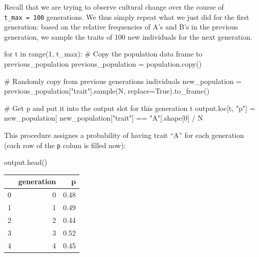\documentclass[
  a4paperpaper,
  ,captions=tableheading
]{scrbook}
\newenvironment{Shaded}{\begin{snugshade}}{\end{snugshade}}
\newcommand{\BuiltInTok}[1]{\textcolor[rgb]{0.00,0.23,0.31}{#1}}
\newcommand{\CommentTok}[1]{\textcolor[rgb]{0.37,0.37,0.37}{#1}}
\newcommand{\ControlFlowTok}[1]{\textcolor[rgb]{0.00,0.23,0.31}{#1}}
\newcommand{\DecValTok}[1]{\textcolor[rgb]{0.68,0.00,0.00}{#1}}
\newcommand{\KeywordTok}[1]{\textcolor[rgb]{0.00,0.23,0.31}{#1}}
\newcommand{\NormalTok}[1]{\textcolor[rgb]{0.00,0.23,0.31}{#1}}
\newcommand{\OperatorTok}[1]{\textcolor[rgb]{0.37,0.37,0.37}{#1}}
\newcommand{\StringTok}[1]{\textcolor[rgb]{0.13,0.47,0.30}{#1}}
\newcommand{\VariableTok}[1]{\textcolor[rgb]{0.07,0.07,0.07}{#1}}
\begin{document}
Recall that we are trying to observe cultural change over the course of
\texttt{t\_max\ =\ 100} generations. We thus simply repeat what we just
did for the first generation: based on the relative frequencies of A's
and B's in the previous generation, we sample the traits of 100 new
individuals for the next generation.

\begin{Shaded}
\begin{Highlighting}[]
\ControlFlowTok{for}\NormalTok{ t }\KeywordTok{in} \BuiltInTok{range}\NormalTok{(}\DecValTok{1}\NormalTok{, t\_max):}
    \CommentTok{\# Copy the population data frame to \textasciigrave{}previous\_population\textasciigrave{}}
\NormalTok{    previous\_population }\OperatorTok{=}\NormalTok{ population.copy()}
  
    \CommentTok{\# Randomly copy from previous generation\textquotesingle{}s individuals}
\NormalTok{    new\_population }\OperatorTok{=}\NormalTok{ previous\_population[}\StringTok{"trait"}\NormalTok{].sample(N, replace}\OperatorTok{=}\VariableTok{True}\NormalTok{).to\_frame()}
    
    \CommentTok{\# Get p and put it into the output slot for this generation t}
\NormalTok{    output.loc[t, }\StringTok{"p"}\NormalTok{] }\OperatorTok{=}\NormalTok{ new\_population[ new\_population[}\StringTok{"trait"}\NormalTok{] }\OperatorTok{==} \StringTok{"A"}\NormalTok{].shape[}\DecValTok{0}\NormalTok{] }\OperatorTok{/}\NormalTok{ N}
\end{Highlighting}
\end{Shaded}

This procedure assignes a probability of having trait ``A'' for each
generation (each row of the \texttt{p} colum is filled now):

\begin{Shaded}
\begin{Highlighting}[]
\NormalTok{output.head()}
\end{Highlighting}
\end{Shaded}

\begin{tabular}{lrr}
\toprule
{} &  generation &     p \\
\midrule
0 &           0 &  0.48 \\
1 &           1 &  0.49 \\
2 &           2 &  0.44 \\
3 &           3 &  0.52 \\
4 &           4 &  0.45 \\
\bottomrule
\end{tabular}
\end{document}
